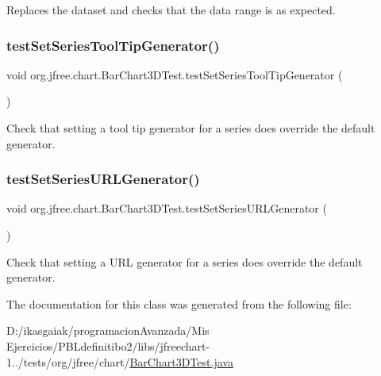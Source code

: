 Replaces the dataset and checks that the data range is as expected. \mbox{\label{classorg_1_1jfree_1_1chart_1_1_bar_chart3_d_test_a9b62e46a5ac1c52d6d9bd890d9870794}} 
\subsubsection{\texorpdfstring{test\+Set\+Series\+Tool\+Tip\+Generator()}{testSetSeriesToolTipGenerator()}}
{\footnotesize\ttfamily void org.\+jfree.\+chart.\+Bar\+Chart3\+D\+Test.\+test\+Set\+Series\+Tool\+Tip\+Generator (\begin{DoxyParamCaption}{ }\end{DoxyParamCaption})}

Check that setting a tool tip generator for a series does override the default generator. \mbox{\label{classorg_1_1jfree_1_1chart_1_1_bar_chart3_d_test_af85e75c99539d37b05bd704038e997bc}} 
\subsubsection{\texorpdfstring{test\+Set\+Series\+U\+R\+L\+Generator()}{testSetSeriesURLGenerator()}}
{\footnotesize\ttfamily void org.\+jfree.\+chart.\+Bar\+Chart3\+D\+Test.\+test\+Set\+Series\+U\+R\+L\+Generator (\begin{DoxyParamCaption}{ }\end{DoxyParamCaption})}

Check that setting a U\+RL generator for a series does override the default generator. 

The documentation for this class was generated from the following file\+:\begin{DoxyCompactItemize}
\item 
D\+:/ikasgaiak/programacion\+Avanzada/\+Mis Ejercicios/\+P\+B\+Ldefinitibo2/libs/jfreechart-\/1../tests/org/jfree/chart/\mbox{\hyperlink{_bar_chart3_d_test_8java}{Bar\+Chart3\+D\+Test.\+java}}\end{DoxyCompactItemize}
